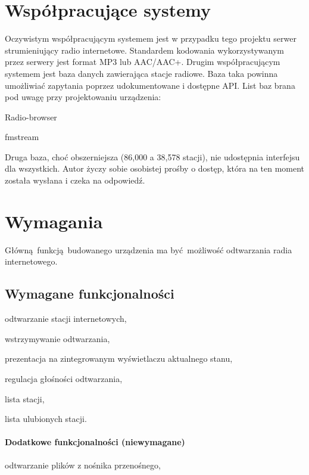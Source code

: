 \documentclass[12pt]{report}
\let\tempone\itemize
\let\temptwo\enditemize
\renewenvironment{itemize}{\tempone\setlength{\itemsep}{0cm}}{\temptwo}
\begin{document}
	\section{Współpracujące systemy}
		Oczywistym współpracującym systemem jest w przypadku tego projektu serwer strumieniujący radio internetowe. Standardem kodowania wykorzystywanym przez serwery jest format MP3 lub AAC/AAC+. Drugim współpracującym systemem jest baza danych zawierająca stacje radiowe. Baza taka powinna umożliwiać zapytania poprzez udokumentowane i dostępne API. List baz brana pod uwagę przy projektowaniu urządzenia:
		\begin{itemize}
			\item Radio-browser\textsuperscript{\cite{radio-browser}}
			\item fmstream\textsuperscript{\cite{fmstream}}
		\end{itemize}
		
		Druga baza, choć obszerniejsza (86,000 a 38,578 stacji), nie udostępnia interfejsu dla wszystkich. Autor życzy sobie osobistej prośby o dostęp, która na ten moment została wysłana i czeka na odpowiedź.
		
	\section{Wymagania}
		Główną funkcją budowanego urządzenia ma być możliwość odtwarzania radia internetowego.
		
		\subsection{Wymagane funkcjonalności}
			\begin{itemize}
				\item odtwarzanie stacji internetowych,
				\item wstrzymywanie odtwarzania,
				\item prezentacja na zintegrowanym wyświetlaczu aktualnego stanu,
				\item regulacja głośności odtwarzania,
				\item lista stacji,
				\item lista ulubionych stacji.
			\end{itemize}
			
			\paragraph{Dodatkowe funkcjonalności (niewymagane)}
			\begin{itemize}
				\item odtwarzanie plików z nośnika przenośnego,
			\end{itemize}
		
\end{document}

